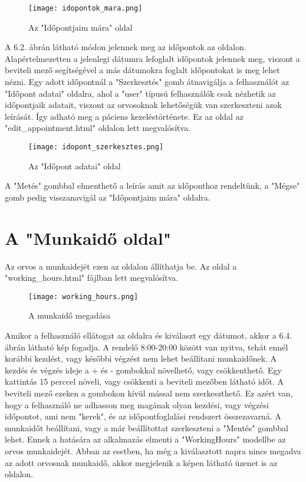 \begin{figure}[H]
	\caption{Az "Időpontjaim mára" oldal}
	\label{fig:idopontjaimmara}
	\centering
	\texttt{[image: idopontok\_mara.png]}
\end{figure}

A 6.2. ábrán látható módon jelennek meg az időpontok az oldalon. Alapértelmezetten a jelenlegi dátumra lefoglalt időpontok jelennek meg, viszont a beviteli mező segítségével a más dátumokra foglalt időpontokat is meg lehet nézni. Egy adott időpontnál a "Szerkesztés" gomb átnavigálja a felhasználót az "Időpont adatai" oldalra, ahol a "user" típusú felhasználók csak nézhetik az időpontjaik adatait, viszont az orvosoknak lehetőségük van szerkeszteni azok leírását. Így adható meg a páciens kezeléstörténete. Ez az oldal az "edit\_appointment.html" oldalon lett megvalósítva.

\begin{figure}[H]
	\caption{Az "Időpont adatai" oldal}
	\label{fig:idopontadatai}
	\centering
	\texttt{[image: idopont\_szerkesztes.png]}
\end{figure}

A "Metés" gombbal elmenthető a leírás amit az időponthoz rendeltünk, a "Mégse" gomb pedig visszanavigál az "Időpontjaim mára" oldalra.

\section{A "Munkaidő oldal"}

Az orvos a munkaidejét ezen az oldalon állíthatja be. Az oldal a "working\_hours.html" fájlban lett megvalósítva.

\begin{figure}[H]
	\caption{A munkaidő megadása}
	\label{fig:munkaidomegadasa}
	\centering
	\texttt{[image: working\_hours.png]}
\end{figure}

Amikor a felhasználó ellátogat az oldalra és kiválaszt egy dátumot, akkor a 6.4. ábrán látható kép fogadja. A rendelő 8:00-20:00 között van nyitva, tehát ennél korábbi kezdést, vagy későbbi végzést nem lehet beállítani munkaidőnek. A kezdés és végzés ideje a + és - gombokkal növelhető, vagy csökkenthető. Egy kattintás 15 perccel növeli, vagy csökkenti a beviteli mezőben látható időt. A beviteli mező ezeken a gombokon kívül mással nem szerkeszthető. Ez azért van, hogy a felhasználó ne adhasson meg magának olyan kezdési, vagy végzési időpontot, ami nem "kerek", és az időpontfoglalási rendszert összezavarná. A munkaidőt beállítani, vagy a már beállítottat szerkeszteni a "Mentés" gombbal lehet. Ennek a hatására az alkalmazás elmenti a "WorkingHours" modellbe az orvos munkaidejét. Abban az esetben, ha még a kiválasztott napra nincs megadva az adott orvosnak munkaidő, akkor megjelenik a képen látható üzenet is az oldalon.


